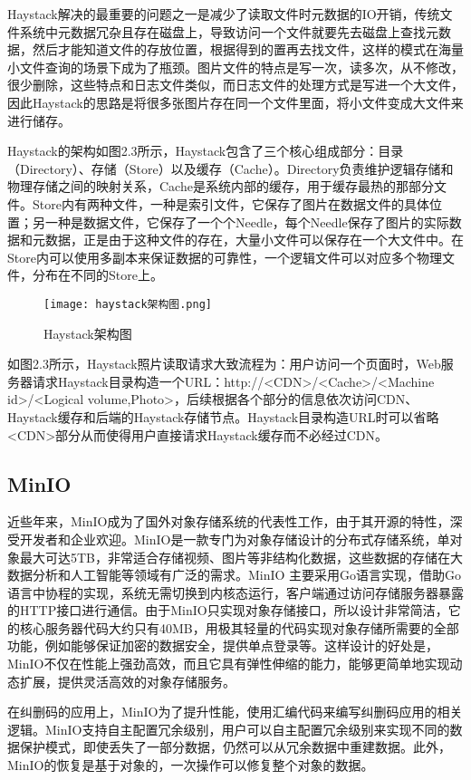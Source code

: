 Haystack解决的最重要的问题之一是减少了读取文件时元数据的IO开销，传统文件系统中元数据冗杂且存在磁盘上，导致访问一个文件就要先去磁盘上查找元数据，然后才能知道文件的存放位置，根据得到的置再去找文件，这样的模式在海量小文件查询的场景下成为了瓶颈。图片文件的特点是写一次，读多次，从不修改，很少删除，这些特点和日志文件类似，而日志文件的处理方式是写进一个大文件，因此Haystack的思路是将很多张图片存在同一个文件里面，将小文件变成大文件来进行储存。

Haystack的架构如图2.3所示，Haystack包含了三个核心组成部分：目录（Directory）、存储（Store）以及缓存（Cache）。Directory负责维护逻辑存储和物理存储之间的映射关系，Cache是系统内部的缓存，用于缓存最热的那部分文件。Store内有两种文件，一种是索引文件，它保存了图片在数据文件的具体位置；另一种是数据文件，它保存了一个个Needle，每个Needle保存了图片的实际数据和元数据，正是由于这种文件的存在，大量小文件可以保存在一个大文件中。在Store内可以使用多副本来保证数据的可靠性，一个逻辑文件可以对应多个物理文件，分布在不同的Store上。

\begin{figure}
    \centering
    \texttt{[image: haystack架构图.png]}
    \caption{Haystack架构图}
\end{figure}

如图2.3所示，Haystack照片读取请求大致流程为：用户访问一个页面时，Web服务器请求Haystack目录构造一个URL：http://<CDN>/<Cache>/<Machine id>/<Logical volume,Photo>，后续根据各个部分的信息依次访问CDN、Haystack缓存和后端的Haystack存储节点。Haystack目录构造URL时可以省略<CDN>部分从而使得用户直接请求Haystack缓存而不必经过CDN。

\subsection{MinIO}%
近些年来，MinIO成为了国外对象存储系统的代表性工作，由于其开源的特性，深受开发者和企业欢迎。MinIO是一款专门为对象存储设计的分布式存储系统，单对象最大可达5TB\cite{37}，非常适合存储视频、图片等非结构化数据，这些数据的存储在大数据分析和人工智能等领域有广泛的需求。MinIO 主要采用Go语言实现，借助Go语言中协程的实现，系统无需切换到内核态运行，客户端通过访问存储服务器暴露的HTTP接口进行通信。由于MinIO只实现对象存储接口，所以设计非常简洁，它的核心服务器代码大约只有40MB，用极其轻量的代码实现对象存储所需要的全部功能，例如能够保证加密的数据安全，提供单点登录等。这样设计的好处是，MinIO不仅在性能上强劲高效，而且它具有弹性伸缩的能力，能够更简单地实现动态扩展，提供灵活高效的对象存储服务。

在纠删码的应用上，MinIO为了提升性能，使用汇编代码来编写纠删码应用的相关逻辑。MinIO支持自主配置冗余级别，用户可以自主配置冗余级别来实现不同的数据保护模式，即使丢失了一部分数据，仍然可以从冗余数据中重建数据。此外，MinIO的恢复是基于对象的，一次操作可以修复整个对象的数据。

